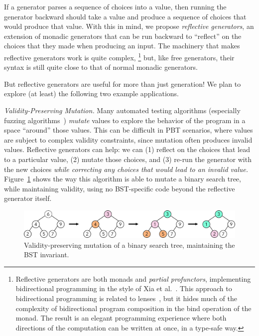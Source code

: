 If a generator parses a sequence of choices into a value, then running the
generator backward should take a value and produce a sequence of choices that
would produce that value. With this in mind, we propose {\em reflective
generators}, an extension of monadic generators that can be run backward to
``reflect'' on the choices that they made when producing an input. The machinery
that makes reflective generators work is quite complex,%
\footnote{Reflective generators are both monads and {\em
    partial profunctors},
implementing bidirectional programming in the style of Xia et
al.~\cite{xia2019composing}. This approach to bidirectional programming is
related to lenses~\cite{foster2009bidirectional}, but it hides much of the
complexity of bidirectional program composition in the bind operation of the
monad. The result is an elegant programming experience where both directions of
the computation can be written at once, in a type-safe way.}
but, like free generators, their syntax is still quite close to that of normal
monadic generators.

But reflective generators are useful for more than just generation!
We plan to explore (at least) the following two example applications.

{\em Validity-Preserving Mutation.} Many automated testing algorithms
(especially fuzzing algorithms~\cite{afl-readme}) {\em mutate} values to explore
the behavior of the program in a space ``around'' those values. This can be
difficult in PBT scenarios, where values are subject to complex validity
constraints, since mutation often produces invalid values. Reflective
generators can help: we can (1) reflect on the choices that lead to a particular
value, (2) mutate those choices, and (3) re-run the generator with the new
choices {\em while correcting any choices that
would lead to an invalid value.} Figure~\ref{fig:mutation} shows the way this
algorithm is able to mutate a binary search tree, while maintaining validity,
using no BST-specific code beyond the reflective generator itself.

\begin{figure}[h]
  \centering
  \includegraphics[width=.6\textwidth]{assets/mutate-diagram.pdf}
  \caption{Validity-preserving mutation of a binary search tree, maintaining the
  BST invariant.}\label{fig:mutation}
\end{figure}

